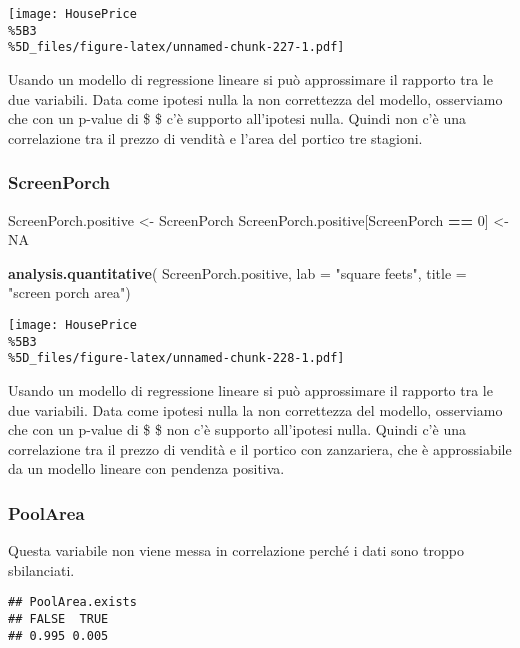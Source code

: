 \documentclass[
]{article}
\newenvironment{Shaded}{\begin{snugshade}}{\end{snugshade}}
\newcommand{\AttributeTok}[1]{\textcolor[rgb]{0.13,0.29,0.53}{#1}}
\newcommand{\ConstantTok}[1]{\textcolor[rgb]{0.56,0.35,0.01}{#1}}
\newcommand{\DecValTok}[1]{\textcolor[rgb]{0.00,0.00,0.81}{#1}}
\newcommand{\FunctionTok}[1]{\textcolor[rgb]{0.13,0.29,0.53}{\textbf{#1}}}
\newcommand{\NormalTok}[1]{#1}
\newcommand{\OtherTok}[1]{\textcolor[rgb]{0.56,0.35,0.01}{#1}}
\newcommand{\SpecialCharTok}[1]{\textcolor[rgb]{0.81,0.36,0.00}{\textbf{#1}}}
\newcommand{\StringTok}[1]{\textcolor[rgb]{0.31,0.60,0.02}{#1}}
\begin{document}
\texttt{[image: HousePrice\\\%5B3\\\%5D\_files/figure-latex/unnamed-chunk-227-1.pdf]}

Usando un modello di regressione lineare si può approssimare il rapporto
tra le due variabili. Data come ipotesi nulla la non correttezza del
modello, osserviamo che con un p-value di \$  \$ c'è
supporto all'ipotesi nulla. Quindi non c'è una correlazione tra il
prezzo di vendità e l'area del portico tre stagioni.

\subsubsection{ScreenPorch}\label{screenporch-1}

\begin{Shaded}
\begin{Highlighting}[]
\NormalTok{ScreenPorch.positive }\OtherTok{\textless{}{-}}\NormalTok{ ScreenPorch}
\NormalTok{ScreenPorch.positive[ScreenPorch }\SpecialCharTok{==} \DecValTok{0}\NormalTok{] }\OtherTok{\textless{}{-}} \ConstantTok{NA}

\FunctionTok{analysis.quantitative}\NormalTok{(}
\NormalTok{    ScreenPorch.positive,}
    \AttributeTok{lab =} \StringTok{"square feets"}\NormalTok{,}
    \AttributeTok{title =} \StringTok{"screen porch area"}\NormalTok{)}
\end{Highlighting}
\end{Shaded}

\texttt{[image: HousePrice\\\%5B3\\\%5D\_files/figure-latex/unnamed-chunk-228-1.pdf]}

Usando un modello di regressione lineare si può approssimare il rapporto
tra le due variabili. Data come ipotesi nulla la non correttezza del
modello, osserviamo che con un p-value di \$  \$ non c'è
supporto all'ipotesi nulla. Quindi c'è una correlazione tra il prezzo di
vendità e il portico con zanzariera, che è approssiabile da un modello
lineare con pendenza positiva.

\subsubsection{PoolArea}\label{poolarea-1}

Questa variabile non viene messa in correlazione perché i dati sono
troppo sbilanciati.

\begin{verbatim}
## PoolArea.exists
## FALSE  TRUE 
## 0.995 0.005
\end{verbatim}
\end{document}
